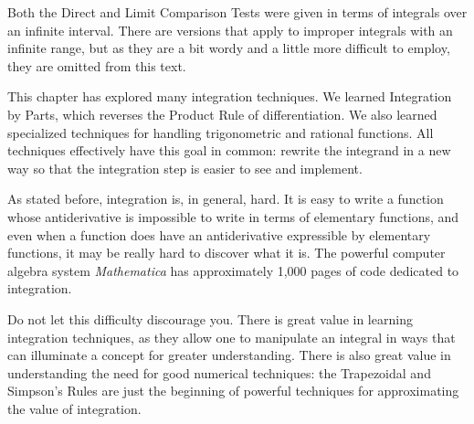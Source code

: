 Both the Direct and Limit Comparison Tests were given in terms of integrals over an infinite interval. There are versions that apply to improper integrals with an infinite range, but as they are a bit wordy and a little more difficult to employ, they are omitted from this text.\bigskip

This chapter has explored many integration techniques. We learned
Integration by Parts, which reverses the Product Rule of differentiation. We also learned specialized techniques for handling trigonometric and rational functions. All techniques effectively have this goal in common: rewrite the integrand in a new way so that the integration step is easier to see and implement.

As stated before, integration is, in general, hard. It is easy to write a function whose antiderivative is impossible to write in terms of elementary functions, and even when a function does have an antiderivative expressible by elementary functions, it may be really hard to discover what it is. The powerful computer algebra system \textit{Mathematica}\textsuperscript{\textregistered} has approximately 1,000 pages of code dedicated to integration. 

Do not let this difficulty discourage you. There is great value in learning integration techniques, as they allow one to manipulate an integral in ways that can illuminate a concept for greater understanding. There is also great value in understanding the need for good numerical techniques: the Trapezoidal and Simpson's Rules are just the beginning of powerful techniques for approximating the value of integration.\bigskip


